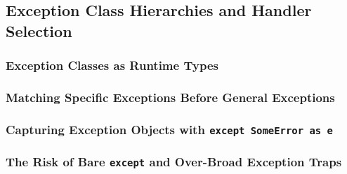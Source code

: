 \subsection{Exception Class Hierarchies and Handler Selection}
\subsubsection{Exception Classes as Runtime Types}
\subsubsection{Matching Specific Exceptions Before General Exceptions}
\subsubsection{Capturing Exception Objects with \texttt{except SomeError as e}}
\subsubsection{The Risk of Bare \texttt{except} and Over-Broad Exception Traps}
